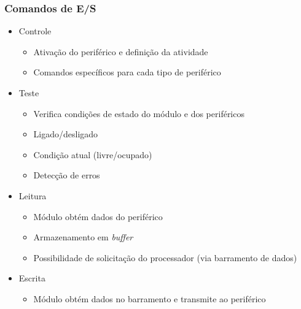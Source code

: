 \documentclass[aspectratio=169,
				xcolor=table]{beamer}
\begin{document}
	\begin{frame}[allowframebreaks]
		\frametitle{Comandos de E/S}
		\begin{itemize}
			\item Controle
			\begin{itemize}
				\item Ativação do periférico e definição da atividade
				\item Comandos específicos para cada tipo de periférico
			\end{itemize}
			\vspace{1em}
			\item Teste
			\begin{itemize}
				\item Verifica condições de estado do módulo e dos periféricos
				\item Ligado/desligado
				\item Condição atual (livre/ocupado)
				\item Detecção de erros
			\end{itemize}
			\framebreak
			\item Leitura
			\begin{itemize}
				\item Módulo obtém dados do periférico
				\item Armazenamento em \textit{buffer}
				\item Possibilidade de solicitação do processador (via barramento de dados)
			\end{itemize}
			\vspace{1em}
			\item Escrita
			\begin{itemize}
				\item Módulo obtém dados no barramento e transmite ao periférico
			\end{itemize}
		\end{itemize}
	\end{frame}
	
\end{document}
